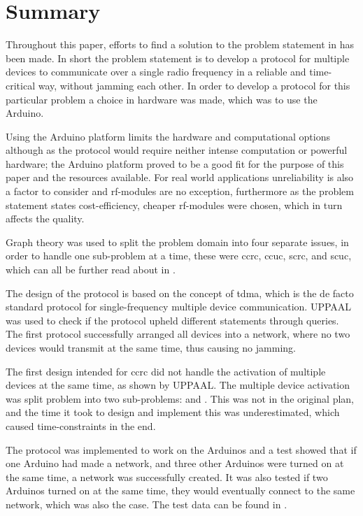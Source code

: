 \section{Summary}\label{cha:conclusion}
Throughout this paper, efforts to find a solution to the problem statement in  has been made.
In short the problem statement is to develop a protocol for multiple devices to communicate over a single radio frequency in a reliable and time-critical way, without jamming each other.
In order to develop a protocol for this particular problem a choice in hardware was made, which was to use the Arduino.

Using the Arduino platform limits the hardware and computational options although as the protocol would require neither intense computation or powerful hardware; the Arduino platform proved to be a good fit for the purpose of this paper and the resources available.
For real world applications unreliability is also a factor to consider and \gls{rf}-modules are no exception, furthermore as the problem statement states cost-efficiency, cheaper \gls{rf}-modules were chosen, which in turn affects the quality.

\bigskip \noindent
Graph theory was used to split the problem domain into four separate issues, in order to handle one sub-problem at a time, these were \acrfull{ccrc}, \acrfull{ccuc}, \acrfull{scrc}, and \acrfull{scuc}, which can all be further read about in .

The design of the protocol is based on the concept of \acrfull{tdma}, which is the de facto standard protocol for single-frequency multiple device communication.
UPPAAL was used to check if the protocol upheld different statements through queries.
The first protocol successfully arranged all devices into a network, where no two devices would transmit at the same time, thus causing no jamming.

The first design intended for \acrshort{ccrc} did not handle the activation of multiple devices at the same time, as shown by UPPAAL.
The multiple device activation was split problem into two sub-problems:  and .
This was not in the original plan, and the time it took to design and implement this was underestimated, which caused time-constraints in the end.

The protocol was implemented to work on the Arduinos and a test showed that if one Arduino had made a network, and three other Arduinos were turned on at the same time, a network was successfully created.
It was also tested if two Arduinos turned on at the same time, they would eventually connect to the same network, which was also the case.
The test data can be found in .

